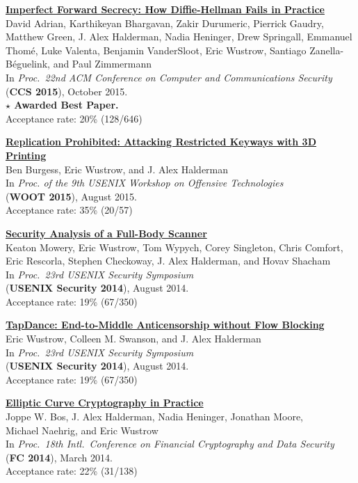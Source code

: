 \documentclass[margin,11pt]{res} %
\begin{document}
    \textbf{\href{https://weakdh.org/}{Imperfect Forward Secrecy: How Diffie-Hellman Fails in Practice}} \\
    David Adrian, Karthikeyan Bhargavan, Zakir Durumeric, Pierrick Gaudry, Matthew Green,
    J. Alex Halderman, Nadia Heninger, Drew Springall, Emmanuel Thom\'e, Luke Valenta,
    Benjamin VanderSloot, Eric Wustrow, Santiago Zanella-B\'eguelink, and Paul Zimmermann \\
    In \emph{Proc.\ 22nd ACM Conference on Computer and Communications Security} \\
    (\textbf{CCS 2015}), October 2015. \\
    \textbf{$\star$ Awarded Best Paper.} \\
    Acceptance rate: 20\% (128/646)

    \textbf{\href{https://keysforge.com/}{Replication Prohibited: Attacking Restricted Keyways with 3D Printing}} \\
    Ben Burgess, Eric Wustrow, and J. Alex Halderman \\
    In \emph{Proc. of the 9th USENIX Workshop on Offensive Technologies} \\
    (\textbf{WOOT 2015}), August 2015. \\
    Acceptance rate: 35\% (20/57)

    \textbf{\href{https://www.radsec.org/paper.html}{Security Analysis of a Full-Body Scanner}} \\
    Keaton Mowery, Eric Wustrow, Tom Wypych, Corey Singleton, Chris Comfort, Eric Rescorla, Stephen Checkoway, J. Alex Halderman, and Hovav Shacham \\
    In \emph{Proc.\ 23rd USENIX Security Symposium} \\
    (\textbf{USENIX Security 2014}), August 2014. \\
    Acceptance rate: 19\% (67/350)

\newpage
    \textbf{\href{https://jhalderm.com/pub/papers/tapdance-sec14.pdf}{TapDance: End-to-Middle Anticensorship without Flow Blocking}} \\
    Eric Wustrow, Colleen M. Swanson, and J. Alex Halderman \\
    In \emph{Proc.\ 23rd USENIX Security Symposium} \\
    (\textbf{USENIX Security 2014}), August 2014. \\
    Acceptance rate: 19\% (67/350)

    \textbf{\href{http://eprint.iacr.org/2013/734}{Elliptic Curve Cryptography in Practice}} \\
    Joppe W. Bos, J. Alex Halderman, Nadia Heninger, Jonathan Moore,\\ Michael Naehrig, and Eric Wustrow \\
    In \emph{Proc.\ 18th Intl.\ Conference on Financial Cryptography and Data Security} \\
    (\textbf{FC 2014}), March 2014. \\
    Acceptance rate: 22\% (31/138)
\end{document}
